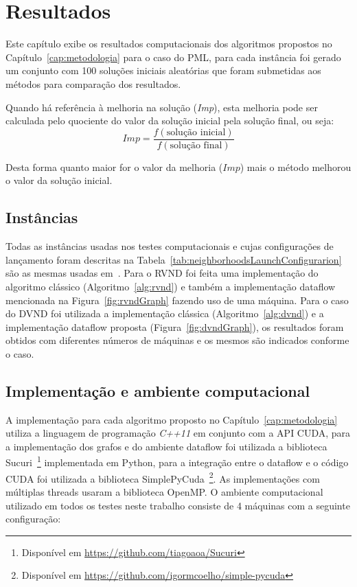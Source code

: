 \chapter{Resultados} \label{cap:resultados}

Este capítulo exibe os resultados computacionais dos algoritmos propostos no Capítulo~\ref{cap:metodologia} para o caso do PML, para cada instância foi gerado um conjunto com 100 soluções iniciais aleatórias que foram submetidas aos métodos para comparação dos resultados.

Quando há referência à melhoria na solução (\textit{Imp}), esta melhoria pode ser calculada pelo quociente do valor da solução inicial pela solução final, ou seja:
\begin{equation}\label{eq:calculateImprovement}
Imp = \frac{f(\textrm{solução inicial})}{f(\textrm{solução final})}
\end{equation}

Desta forma quanto maior for o valor da melhoria ($Imp$) mais o método melhorou o valor da solução inicial.

\section{Instâncias} \label{sec:instancias}

Todas as instâncias usadas nos testes computacionais e cujas configurações de lançamento foram descritas na Tabela~\ref{tab:neighborhoodsLaunchConfigurarion} são as mesmas usadas em~\cite{wamca2016}.
Para o RVND foi feita uma implementação do algoritmo clássico (Algoritmo~\ref{alg:rvnd}) e também a implementação dataflow mencionada na Figura~\ref{fig:rvndGraph} fazendo uso de uma máquina.
Para o caso do DVND foi utilizada a implementação clássica (Algoritmo~\ref{alg:dvnd}) e a implementação dataflow proposta (Figura~\ref{fig:dvndGraph}), os resultados foram obtidos com diferentes números de máquinas e os mesmos são indicados conforme o caso.

\section{Implementação e ambiente computacional}\label{sec:amb}

A implementação para cada algoritmo proposto no Capítulo~\ref{cap:metodologia} utiliza a linguagem de programação \textit{C++11} em conjunto com a API CUDA\texttrademark, para a implementação dos grafos e do ambiente dataflow foi utilizada a biblioteca Sucuri~\cite{sucuri-original}\footnote{Disponível em \url{https://github.com/tiagoaoa/Sucuri}} implementada em Python, para a integração entre o dataflow e o código CUDA foi utilizada a biblioteca SimplePyCuda~\cite{simple-pycuda}\footnote{Disponível em \url{https://github.com/igormcoelho/simple-pycuda}}. As implementações com múltiplas threads usaram a biblioteca OpenMP.
O ambiente computacional utilizado em todos os testes neste trabalho consiste de 4 máquinas com a seguinte configuração:

